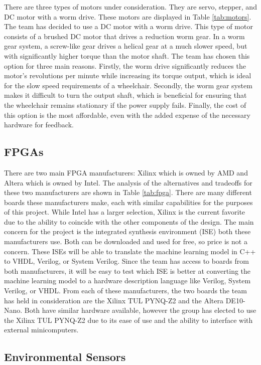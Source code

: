 \documentclass[conference]{IEEEtran}
\begin{document}
         {There are three types of motors under consideration. They are servo, stepper, and DC motor with a worm drive.} These motors are displayed in Table \ref{tab:motors}.  {The team has decided to use a DC motor with a worm drive. This type of motor consists of a brushed DC motor that drives a reduction worm gear. In a worm gear system, a screw-like gear drives a helical gear at a much slower speed, but with significantly higher torque than the motor shaft. The team has chosen this option for three main reasons. Firstly, the worm drive significantly reduces the motor's revolutions per minute while increasing its torque output, which is ideal for the slow speed requirements of a wheelchair. Secondly, the worm gear system makes it difficult to turn the output shaft, which is beneficial for ensuring that the wheelchair remains stationary if the power supply fails. Finally, the cost of this option is the most affordable, even with the added expense of the necessary hardware for feedback.} 

        \subsection{FPGAs}
        There are two main FPGA manufacturers: Xilinx which is owned by AMD and Altera which is owned by Intel. The analysis of the alternatives and tradeoffs for these two manufacturers are shown in Table \ref{tab:fpga}. There are many different boards these manufacturers make, each with similar capabilities for the purposes of this project. While Intel has a larger selection, Xilinx is the current favorite due to the ability to coincide with the other components of the design. The main concern for the project is the integrated synthesis environment (ISE) both these manufacturers use. Both can be downloaded and used for free, so price is not a concern. These ISEs will be able to translate the machine learning model in C++ to VHDL, Verilog, or System Verilog. Since the team has access to boards from both manufacturers, it will be easy to test which ISE is better at converting the machine learning model to a hardware description language like Verilog, System Verilog, or VHDL. From each of these manufacturers, the two boards the team has held in consideration are the Xilinx TUL PYNQ-Z2 and the Altera DE10-Nano. Both have similar hardware available, however the  {group has elected to use the Xilinx TUL PYNQ-Z2}  due to its ease of use and the ability to interface with external minicomputers. 

        \subsection{Environmental Sensors}
\end{document}
